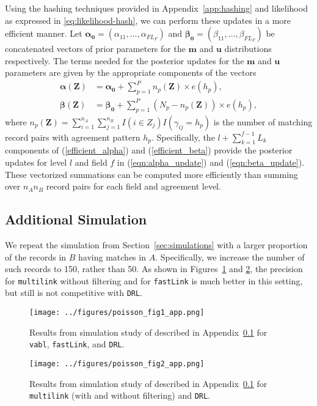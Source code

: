 \documentclass[12pt,letterpaper]{article}
\newcommand{\1}[1]{\mathbb{I}\!\left[#1\right]} %
\begin{document}
Using the hashing techniques provided in Appendix~\ref{app:hashing} and likelihood as expressed in \eqref{eq:likelihood-hash}, we can perform these updates in a more efficient manner. Let $\bm{\alpha_0} = (\alpha_{11}, \ldots, \alpha_{F L_F})$ and $\bm{\beta_0}= (\beta_{11}, \ldots, \beta_{F L_F})$ be concatenated vectors of prior parameters for the $\bm{m}$ and $\bm{u}$ distributions respectively. The terms needed for the posterior updates for the $\bm{m}$ and $\bm{u}$ parameters are given by the appropriate components of the vectors
	\begin{align}
		\bm{\alpha(\bm{Z})} &= \bm{\alpha_0} + \sum_{p=1}^P n_p\left(\bm{Z} \right) \times e(h_p), \label{efficient_alpha} \\
		\bm{\beta(\bm{Z})} &= \bm{\beta_0} + \sum_{p=1}^P \left(N_p - n_p\left(\bm{Z}\right)\right) \times e(h_p), \label{efficient_beta}
	\end{align}
where $n_p(\bm{Z}) = \sum_{i = 1}^{n_A}\sum_{j = 1}^{n_B} I(i \in Z_{j}) I\left(\gamma_{ij} = h_p \right)$ is the number of matching record pairs with agreement pattern $h_p$. Specifically, the $l + \sum_{k=1}^{f-1} L_k$ components of (\ref{efficient_alpha}) and (\ref{efficient_beta}) provide the posterior updates for level $l$ and field $f$ in (\ref{eqn:alpha_update}) and (\ref{eqn:beta_update}). These vectorized summations can be computed more efficiently than summing over $n_A n_B$ record pairs for each field and agreement level.

\subsection{Additional Simulation}\label{app:simulation-2}

We repeat the simulation from Section~\ref{sec:simulations} with a larger proportion of the records in $B$ having matches in $A$. Specifically, we increase the number of such records to 150, rather than 50. As shown in Figures~\ref{fig:sim-vabl-comparison-2} and \ref{fig:sim-multilink-comparison-2}, the precision for \texttt{multilink} without filtering and for \texttt{fastLink} is much better in this setting, but still is not competitive with \texttt{DRL}. 

\begin{figure}[t]
	\centering
	\texttt{[image: ../figures/poisson\_fig1\_app.png]}
	\caption{Results from simulation study of described in Appendix~\ref{app:simulation-2} for \texttt{vabl}, \texttt{fastLink}, and \texttt{DRL}.}
	\label{fig:sim-vabl-comparison-2}
\end{figure}

\begin{figure}
	\centering
	\texttt{[image: ../figures/poisson\_fig2\_app.png]}
	\caption{Results from simulation study of described in Appendix~\ref{app:simulation-2} for \texttt{multilink} (with and without filtering) and \texttt{DRL}.}
	\label{fig:sim-multilink-comparison-2}
\end{figure}
\end{document}
